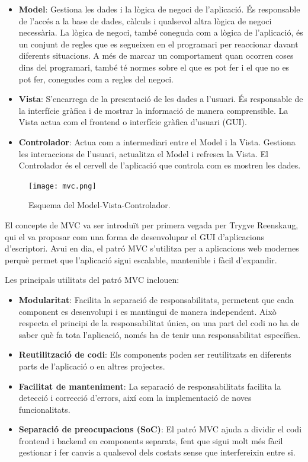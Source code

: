 \documentclass{ieeetj}
\begin{document}
\begin{itemize}
    \item \textbf{Model}: Gestiona les dades i la lògica de negoci de l'aplicació. És responsable de l'accés a la base de dades, càlculs i qualsevol altra lògica de negoci necessària. La lògica de negoci, també coneguda com a lògica de l'aplicació, és un conjunt de regles que es segueixen en el programari per reaccionar davant diferents situacions. A més de marcar un comportament quan ocorren coses dins del programari, també té normes sobre el que es pot fer i el que no es pot fer, conegudes com a regles del negoci.
    \item \textbf{Vista}: S'encarrega de la presentació de les dades a l'usuari. És responsable de la interfície gràfica i de mostrar la informació de manera comprensible. La Vista actua com el frontend o interfície gràfica d'usuari (GUI).
    \item \textbf{Controlador}: Actua com a intermediari entre el Model i la Vista. Gestiona les interaccions de l'usuari, actualitza el Model i refresca la Vista. El Controlador és el cervell de l'aplicació que controla com es mostren les dades.
\end{itemize}

\begin{figure}[htbp]
\centerline{\texttt{[image: mvc.png]}}
\caption{Esquema del Model-Vista-Controlador.}
\label{fig:mvc}
\end{figure}

El concepte de MVC va ser introduït per primera vegada per Trygve Reenskaug, qui el va proposar com una forma de desenvolupar el GUI d'aplicacions d'escriptori. Avui en dia, el patró MVC s'utilitza per a aplicacions web modernes perquè permet que l'aplicació sigui escalable, mantenible i fàcil d'expandir.

Les principals utilitats del patró MVC inclouen:
\begin{itemize}
    \item \textbf{Modularitat}: Facilita la separació de responsabilitats, permetent que cada component es desenvolupi i es mantingui de manera independent. Això respecta el principi de la responsabilitat única, on una part del codi no ha de saber què fa tota l'aplicació, només ha de tenir una responsabilitat específica.
    \item \textbf{Reutilització de codi}: Els components poden ser reutilitzats en diferents parts de l'aplicació o en altres projectes.
    \item \textbf{Facilitat de manteniment}: La separació de responsabilitats facilita la detecció i correcció d'errors, així com la implementació de noves funcionalitats.
    \item \textbf{Separació de preocupacions (SoC)}: El patró MVC ajuda a dividir el codi frontend i backend en components separats, fent que sigui molt més fàcil gestionar i fer canvis a qualsevol dels costats sense que interfereixin entre si.
\end{itemize}
\end{document}
